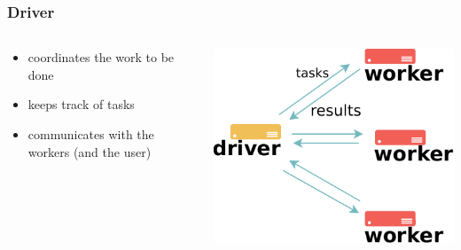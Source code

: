 \documentclass[english,serif,mathserif]{beamer}
\begin{document}
\begin{frame}
  \frametitle{Driver}

  \begin{columns}
    \begin{column}{0.5\textwidth}
      \begin{itemize}
      \item
        coordinates the work to be done
      \item
        keeps track of tasks
      \item
        communicates with the workers (and the user)
      \end{itemize}
    \end{column}
    \begin{column}{0.5\textwidth}
      \includegraphics[height=0.45\textheight]{fig/spark_architecture.pdf}
    \end{column}
  \end{columns}
\end{frame}
\end{document}
